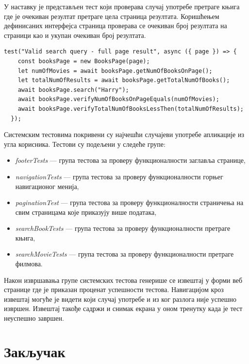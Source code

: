 \documentclass[12pt,oneside]{memoir}
\begin{document}
\newpage
У наставку је представљен тест који проверава случај употребе претраге књига где је очекиван резултат претраге цела страница резултата. Коришћењем дефинисаних интерфејса страница проверава се очекиван број резултата на страници као и укупан очекиван број резултата.


\begin{lstlisting}[caption=Тест случаја употребе --- претрага књига, 
basicstyle=\tiny,
label={lst:pretragaKnjiga},
frame=single]
 test("Valid search query - full page result", async ({ page }) => {
    const booksPage = new BooksPage(page);
    let numOfMovies = await booksPage.getNumOfBooksOnPage();
    let totalNumOfResults = await booksPage.getTotalNumOfBooks();
    await booksPage.search("Harry");
    await booksPage.verifyNumOfBooksOnPageEquals(numOfMovies);
    await booksPage.verifyTotalNumOfBooksLessThen(totalNumOfResults);
  });
\end{lstlisting}

Системским тестовима покривени су најчешћи случајеви употребе апликације из угла корисника. Тестови су подељени у следеће групе:
\begin{itemize}
\item \textit{footerTests} --- група тестова за проверу функционалности заглавља странице,
\item \textit{navigationTests} --- група тестова за проверу функционалности горњег навигационог менија,
\item \textit{paginationTest} --- група тестова за проверу функционалности страничења на свим страницама које приказују више података,
\item \textit{searchBookTests} --- група тестова за проверу функционалности претраге књига,
\item \textit{searchMovieTests} --- група тестова за проверу функционалности претраге филмова.
\end{itemize}

 Након извршавања групе системских тестова генерише се извештај у форми веб странице где је приказан проценат успешности тестова. Навигацијом кроз извештај могуће је видети који случај употребе и из ког разлога није успешно извршен. Извештај такође садржи и снимак екрана у оном тренутку када је тест неуспешно завршен. 
 
 



\chapter{Закључак}
\end{document}
